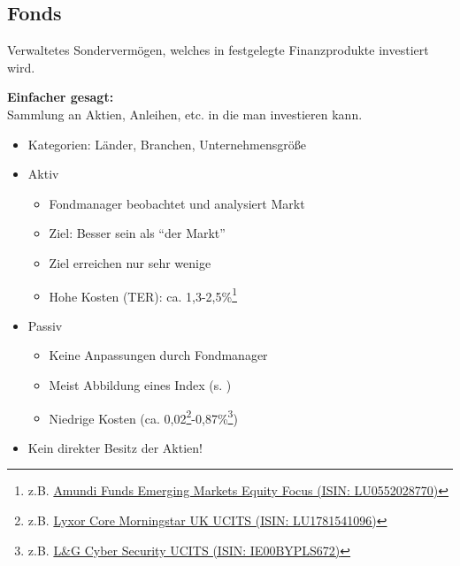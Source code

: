 \documentclass{beamer}
\begin{document}
		\subsection{Fonds}
		
			\begin{frame}
				\begin{definition}
					Verwaltetes Sondervermögen, welches in festgelegte Finanzprodukte investiert wird.
				\end{definition}\hfill
			
				\textbf{Einfacher gesagt:}\\
				Sammlung an Aktien, Anleihen, etc. in die man investieren kann.
			\end{frame}
		
			\begin{frame}
				\begin{itemize}
					\item Kategorien: Länder, Branchen, Unternehmensgröße\pause
					\item Aktiv
					\begin{itemize}
						\item Fondmanager beobachtet und analysiert Markt
						\item Ziel: Besser sein als "`der Markt"'
						\item Ziel erreichen nur sehr wenige
						\item Hohe Kosten (TER): ca. 1,3-2,5\%\footnote{z.B. \href{https://www.comdirect.de/inf/fonds/LU0552028770}{Amundi Funds Emerging Markets Equity Focus (ISIN: LU0552028770)}}
					\end{itemize}\pause
					\item Passiv\pause
					\begin{itemize}
						\item Keine Anpassungen durch Fondmanager
						\item Meist Abbildung eines Index (s. \nameref{subsec:etfs})
						\item Niedrige Kosten (ca. 0,02\footnote{z.B. \href{https://de.extraetf.com/etf-profile/LU1781541096}{Lyxor Core Morningstar UK UCITS (ISIN: LU1781541096)}}-0,87\%\footnote{z.B. \href{https://de.extraetf.com/etf-profile/IE00BYPLS672}{L\&G Cyber Security UCITS (ISIN: IE00BYPLS672)}})
					\end{itemize}\pause
					\item Kein direkter Besitz der Aktien!
				\end{itemize}
			\end{frame}
		
\end{document}
